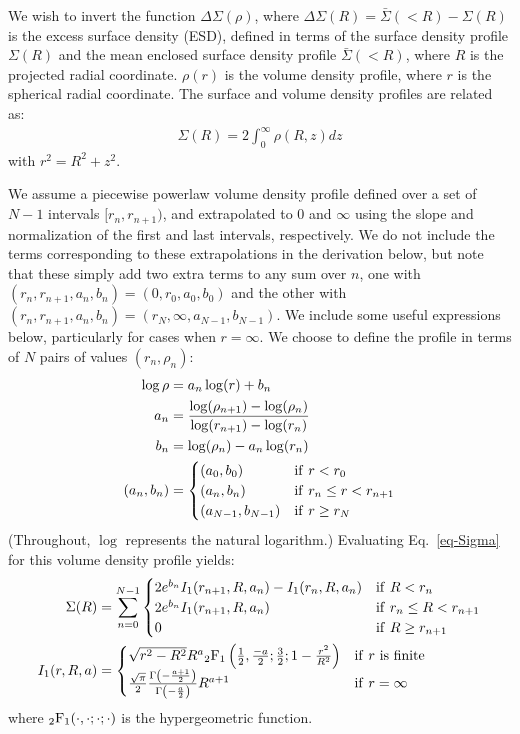\documentclass{article}
\begin{document}
We wish to invert the function $\Delta\Sigma(\rho)$, where $\Delta\Sigma(R) = \bar{\Sigma}(<R) - \Sigma(R)$ is the excess surface density (ESD), defined in terms of the surface density profile $\Sigma(R)$ and the mean enclosed surface density profile $\bar{\Sigma}(<R)$, where $R$ is the projected radial coordinate. $\rho(r)$ is the volume density profile, where $r$ is the spherical radial coordinate. The surface and volume density profiles are related as:
\begin{align}
  \Sigma(R) = 2\int_0^\infty\rho(R, z)dz\label{eq-Sigma}
\end{align}
with $r^2 = R^2 + z^2$.

We assume a piecewise powerlaw volume density profile defined over a set of $N-1$ intervals $[r_n, r_{n+1})$, and extrapolated to $0$ and $\infty$ using the slope and normalization of the first and last intervals, respectively. We do not include the terms corresponding to these extrapolations in the derivation below, but note that these simply add two extra terms to any sum over $n$, one with $(r_n,r_{n+1},a_n,b_n) = (0, r_0, a_0, b_0)$ and the other with $(r_n,r_{n+1},a_n,b_n) = (r_N, \infty, a_{N-1}, b_{N-1})$. We include some useful expressions below, particularly for cases when $r=\infty$. We choose to define the profile in terms of $N$ pairs of values $(r_n,\rho_n)$:
\begin{align}
  \log\rho &= a_n \log(r) + b_n \\
  a_n &= \frac{\log(\rho_{n+1})-\log(\rho_n)}{\log(r_{n+1})-\log(r_n)}\\
  b_n &= \log(\rho_n) - a_n\log(r_n)\\
  (a_n, b_n) &=
  \begin{cases}
    (a_0, b_0) & {\rm if}\ r < r_0\\
    (a_n, b_n) & {\rm if}\ r_n \leq r < r_{n+1}\\
    (a_{N-1}, b_{N-1}) & {\rm if}\ r \geq r_N
  \end{cases}
\end{align}
(Throughout, $\log$ represents the natural logarithm.) Evaluating Eq.~\ref{eq-Sigma} for this volume density profile yields:
\begin{align}
  \Sigma(R) &= \sum_{n=0}^{N-1}
  \begin{cases}
    2e^{b_n}I_1(r_{n+1}, R, a_n) - I_1(r_n, R, a_n) & {\rm if}\ R < r_n\\
    2e^{b_n}I_1(r_{n+1}, R, a_n) & {\rm if}\ r_n \leq R < r_{n+1}\\
    0 & {\rm if}\ R \geq r_{n+1}\\
  \end{cases} \label{eq-Sigma-discrete}\\
  I_1(r, R, a) &=
  \begin{cases}
    \sqrt{r^2-R^2}R^a{}_2{\rm F}_1\left(\frac{1}{2},\frac{-a}{2};\frac{3}{2};1-\frac{r^2}{R^2}\right) & {\rm if}\ r\ {\rm is}\ {\rm finite}\\
    \frac{\sqrt{\pi}}{2}\frac{\Gamma\left(-\frac{a+1}{2}\right)}{\Gamma\left(-\frac{a}{2}\right)}R^{a+1} & {\rm if}\ r = \infty
  \end{cases}
\end{align}
where ${}_2{\rm F}_1(\cdot,\cdot;\cdot;\cdot)$ is the hypergeometric function.
\end{document}
